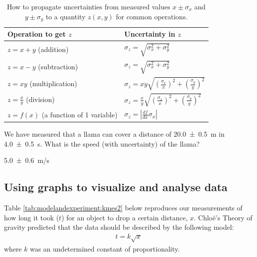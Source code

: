 \begin{table}[H]
\centering
\begin{tabular}{ll}
\textbf{Operation to get $z$} &\textbf{Uncertainty in $z$} \\
\hline
\hline
$z=x+y$ (addition) &  $\sigma_z=\sqrt{\sigma_x^2+\sigma_y^2}$ \\ \hline
$z=x-y$ (subtraction) & $\sigma_z=\sqrt{\sigma_x^2+\sigma_y^2}$ \\ \hline
$z=xy$ (multiplication) & $\sigma_z=xy\sqrt{\left(\frac{\sigma_x}{x}\right)^2+\left(\frac{\sigma_y}{y}\right)^2}$ \\ \hline
$z=\frac{x}{y}$ (division) & $\sigma_z=\frac{x}{y}\sqrt{\left(\frac{\sigma_x}{x}\right)^2+\left(\frac{\sigma_y}{y}\right)^2}$ \\ \hline
$z=f(x)$ (a function of 1 variable) &$\sigma_z=\left|\frac{df}{dx}\sigma_x \right|$ \\ \hline
\end{tabular}
\caption{\label{tab:modelandexperiment:prop_uncertainties} How to propagate uncertainties from measured values $x\pm\sigma_x$ and $y\pm\sigma_y$ to a quantity $z(x,y)$ for common operations.}
\end{table}

\begin{checkpoint}{We have measured that a llama can cover a distance of \SI{20.0 \pm 0.5}{m} in \SI{4.0\pm 0.5}{s}. What is the speed (with uncertainty) of the llama?}
\begin{answer}
\SI{5.0 \pm 0.6}{m/s}
\end{answer}
\end{checkpoint}

\subsection{Using graphs to visualize and analyse data}
Table \ref{tab:modelandexperiment:kmes2} below reproduces our measurements of how long it took ($t$) for an object to drop a certain distance, $x$.  Chlo\"e's Theory of gravity predicted that the data should be described by the following model:
\begin{align*}
t = k \sqrt{x}
\end{align*}
where $k$ was an undetermined constant of proportionality.

